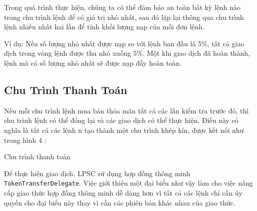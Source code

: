 \documentclass{article}
\makeatletter
\newenvironment{figurehere}
 {\def\@captype{figure}}
 {}
\makeatother
\begin{document}
\begin{multicols}{2}
Trong quá trình thực hiện, chúng ta có thể đảm bảo an toàn bất kỳ lệnh nào trong chu trình lệnh để có giá trị nhỏ nhất, sau đó lặp lại thông qua chu trình lệnh nhiều nhất hai lần để tính khối lượng nạp của mỗi đơn lệnh. 

Ví dụ: Nếu số lượng nhỏ nhất được nạp so với lệnh ban đầu là 5\%, tất cả giao dịch trong vòng lệnh được thu nhỏ xuống 5\%. Một khi giao dịch đã hoàn thành, lệnh mà có số lượng nhỏ nhất sẽ được nạp đầy hoàn toàn.

\subsection{Chu Trình Thanh Toán\label{sec:settlement}}

Nếu mỗi chu trình lệnh mua bán thỏa mãn tất cả các lần kiểm tra trước đó, thì chu trình lệnh có thể đóng lại và các giao dịch có thể thực hiện. Điều này có nghĩa là tất cả các lệnh n tạo thành một chu trình khép kín, được kết nối như trong hình 4 :

\begin{center}
\begin{figurehere}
\centering
{}
\caption{Chu trình thanh toán}
\label{fig:settlement}
\end{figurehere}
\end{center}

Để thực hiện giao dịch, LPSC sử dụng hợp đồng thông minh \verb|TokenTransferDelegate|. Việc giới thiệu một đại biểu như vậy làm cho việc nâng cấp giao thức hợp đồng thông minh dễ dàng hơn vì tất cả các lệnh chỉ cần ủy quyền cho đại biểu này thay vì cần các phiên bản khác nhau của giao thức.


\end{multicols}
\end{document}
